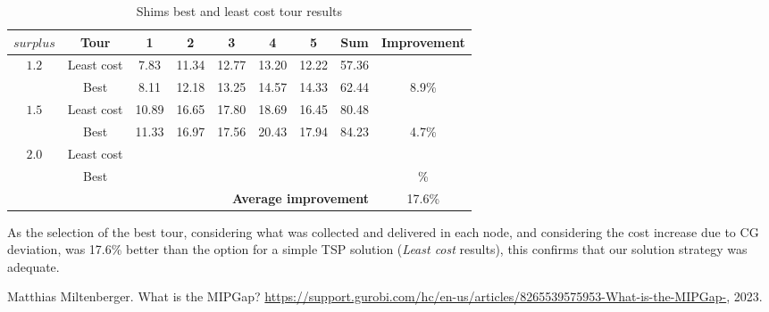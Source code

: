 \documentclass[preprint]{elsarticle}
\begin{document}
\begin{table}[H]
\centering
\caption{Shims best and least cost tour results}  \label{tab:20least}
\footnotesize
\begin{tabular}{ccccccccc}
\toprule
{$surplus$}              & {\bf Tour} & {\bf 1} & {\bf 2} & {\bf 3} & {\bf 4}  & {\bf 5}   & {\bf Sum} & {\bf Improvement}\\

\midrule[.1pt]	
\multirow{2}{*}{$1.2$}   & Least cost    & 7.83    & 11.34 & 12.77 & 13.20 & 12.22  & 57.36 &       \\ 
& Best                                   & 8.11    & 12.18 & 13.25 & 14.57 & 14.33  & 62.44 & 8.9\%  \\ 
\midrule[.1pt]	
\multirow{2}{*}{$1.5$}   & Least cost    & 10.89   & 16.65 & 17.80 & 18.69 & 16.45  & 80.48 & \\ %
& Best                                   & 11.33   & 16.97 & 17.56 & 20.43 & 17.94  & 84.23 & 4.7\%  \\ 
\midrule[.1pt]	
\multirow{2}{*}{$2.0$}   & Least cost    &  &    &    &     &   &  &   \\ %
& Best                                   &  &    &    &     &   &  & \%  \\ 		                         

\midrule[.1pt]
 \multicolumn{8}{r}{{\bf Average improvement}} & 17.6\% \\
\bottomrule
\end{tabular}
\normalsize
\end{table}

As the selection of the best tour, considering what was collected and delivered in each node, and considering the cost increase due to CG deviation, was 17.6\% better than the option for a simple TSP solution (\textit{Least cost} results), this confirms that our solution strategy was adequate.


\begin{thebibliography}{00}
	
	 Matthias Miltenberger. What is the MIPGap? \url{https://support.gurobi.com/hc/en-us/articles/8265539575953-What-is-the-MIPGap-}, 2023.
	
\end{thebibliography}
\end{document}
